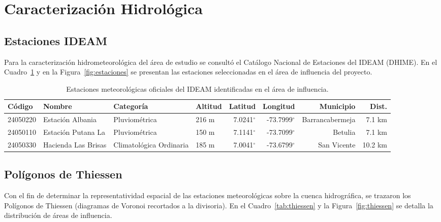 \documentclass[11pt,a4paper]{article}
\begin{document}
\section{Caracterización Hidrológica}

\subsection{Estaciones IDEAM}
Para la caracterización hidrometeorológica del área de estudio se consultó el Catálogo Nacional de Estaciones del IDEAM (DHIME). En el Cuadro~\ref{tab:estaciones_ideam} y en la Figura~\ref{fig:estaciones} se presentan las estaciones seleccionadas en el área de influencia del proyecto.

\begin{table}[H]
\centering
\caption{Estaciones meteorológicas oficiales del IDEAM identificadas en el área de influencia.}
\label{tab:estaciones_ideam}
%
\begin{tabular}{llllrrrr}\toprule
\textbf{Código} & \textbf{Nombre} & \textbf{Categoría} & \textbf{Altitud} & \textbf{Latitud} & \textbf{Longitud} & \textbf{Municipio} & \textbf{Dist.} \\\midrule
24050220 & Estación Albania & Pluviométrica & 216 m & 7.0241$^\circ$ & -73.7999$^\circ$ & Barrancabermeja & 7.1 km \\
24050110 & Estación Putana La & Pluviométrica & 150 m & 7.1141$^\circ$ & -73.7099$^\circ$ & Betulia & 7.1 km \\
24050330 & Hacienda Las Brisas & Climatológica Ordinaria & 185 m & 7.0041$^\circ$ & -73.6799$^\circ$ & San Vicente & 10.2 km \\
\bottomrule
\end{tabular}
\end{table}



\subsection{Polígonos de Thiessen}
Con el fin de determinar la representatividad espacial de las estaciones meteorológicas sobre la cuenca hidrográfica, se trazaron los Polígonos de Thiessen (diagramas de Voronoi recortados a la divisoria). En el Cuadro~\ref{tab:thiessen} y la Figura~\ref{fig:thiessen} se detalla la distribución de áreas de influencia.
\end{document}
